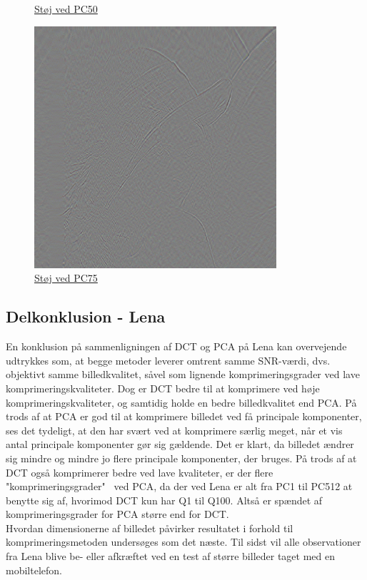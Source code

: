\begin{figure}
\begin{minipage}[b]{0.31\linewidth}
\caption{\href{https://www.dropbox.com/home/P1\%20-\%20B205/vejleder/billeder/PCA/Fejlbilleder?preview=fejlPC50.png}{Støj ved PC50}}
\label{fig:noisePC50}
\end{minipage}
\hspace{0.2cm}
\begin{minipage}[b]{0.31\linewidth}
\centering
\includegraphics[width=0.8\textwidth]{Billeder/fejlbilleder/fejlPC75.png}
\caption{\href{https://www.dropbox.com/home/P1\%20-\%20B205/vejleder/billeder/PCA/Fejlbilleder?preview=fejlPC75.png}{Støj ved PC75}}
\label{fig:noisePC75}
\end{minipage}
\end{figure}

\subsection*{Delkonklusion - Lena}
En konklusion på sammenligningen af DCT og PCA på Lena kan overvejende udtrykkes som, at begge metoder leverer omtrent samme SNR-værdi, dvs. objektivt samme billedkvalitet, såvel som lignende komprimeringsgrader ved lave komprimeringskvaliteter. Dog er DCT bedre til at komprimere ved høje komprimeringskvaliteter, og samtidig holde en bedre billedkvalitet end PCA. På trods af at PCA er god til at komprimere billedet ved få principale komponenter, ses det tydeligt, at den har svært ved at komprimere særlig meget, når et vis antal principale komponenter gør sig gældende. Det er klart, da billedet ændrer sig mindre og mindre jo flere principale komponenter, der bruges. På trods af at DCT også komprimerer bedre ved lave kvaliteter, er der flere "komprimeringsgrader" \ ved PCA, da der ved Lena er alt fra PC1 til PC512 at benytte sig af, hvorimod DCT kun har Q1 til Q100. Altså er spændet af komprimeringsgrader for PCA større end for DCT.\\
Hvordan dimensionerne af billedet påvirker resultatet i forhold til komprimeringsmetoden undersøges som det næste. Til sidst vil alle observationer fra Lena blive be- eller afkræftet ved en test af større billeder taget med en mobiltelefon.

